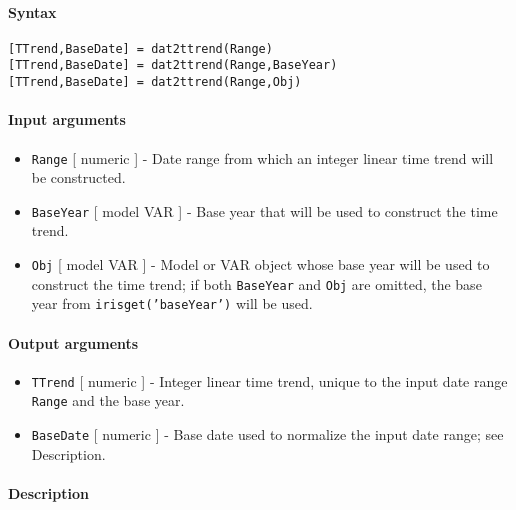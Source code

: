 


	\paragraph{Syntax}\label{syntax}

\begin{verbatim}
[TTrend,BaseDate] = dat2ttrend(Range)
[TTrend,BaseDate] = dat2ttrend(Range,BaseYear)
[TTrend,BaseDate] = dat2ttrend(Range,Obj)
\end{verbatim}

\paragraph{Input arguments}\label{input-arguments}

\begin{itemize}
\item
  \texttt{Range} {[} numeric {]} - Date range from which an integer
  linear time trend will be constructed.
\item
  \texttt{BaseYear} {[} model \textbar{} VAR {]} - Base year that will
  be used to construct the time trend.
\item
  \texttt{Obj} {[} model \textbar{} VAR {]} - Model or VAR object whose
  base year will be used to construct the time trend; if both
  \texttt{BaseYear} and \texttt{Obj} are omitted, the base year from
  \texttt{irisget('baseYear')} will be used.
\end{itemize}

\paragraph{Output arguments}\label{output-arguments}

\begin{itemize}
\item
  \texttt{TTrend} {[} numeric {]} - Integer linear time trend, unique to
  the input date range \texttt{Range} and the base year.
\item
  \texttt{BaseDate} {[} numeric {]} - Base date used to normalize the
  input date range; see Description.
\end{itemize}

\paragraph{Description}\label{description}

